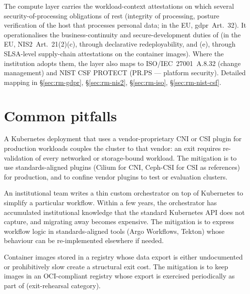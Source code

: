 \noindent The compute layer carries the workload-context
attestations on which several security-of-processing obligations
of  rest (integrity of processing,
posture verification of the host that processes personal data; in
the EU, \gls{gdpr}~Art.~32). It operationalises the
business-continuity and secure-development duties of
 (in the EU, NIS2~Art.~21(2)(c),
through declarative redeployability, and (e), through SLSA-level
supply-chain attestations on the container images). Where the
institution adopts them, the layer also maps to ISO/IEC~27001~A.8.32
(change management) and NIST CSF \textsf{PROTECT} (PR.PS ---
platform security). Detailed mapping in
 \S\ref{sec:rm-gdpr},
\S\ref{sec:rm-nis2}, \S\ref{sec:rm-iso}, \S\ref{sec:rm-nist-csf}.

\section{Common pitfalls}
\label{sec:co-pitfalls}

\begin{pitfallbox}
\noindent A Kubernetes deployment that uses a vendor-proprietary CNI
or CSI plugin for production workloads couples the cluster to that
vendor: an exit requires re-validation of every networked or
storage-bound workload. The mitigation is to use standards-aligned
plugins (Cilium for CNI, Ceph-CSI for CSI as references) for
production, and to confine vendor plugins to test or evaluation
clusters.
\end{pitfallbox}

\begin{pitfallbox}
\noindent An institutional team writes a thin custom orchestrator on
top of Kubernetes to simplify a particular workflow. Within a few
years, the orchestrator has accumulated institutional knowledge that
the standard Kubernetes API does not capture, and migrating away
becomes expensive. The mitigation is to express workflow logic in
standards-aligned tools (Argo Workflows, Tekton) whose behaviour can
be re-implemented elsewhere if needed.
\end{pitfallbox}

\begin{pitfallbox}
\noindent Container images stored in a registry whose data export is
either undocumented or prohibitively slow create a structural exit
cost. The mitigation is to keep images in an OCI-compliant registry
whose export is exercised periodically as part of
 (exit-rehearsal category).
\end{pitfallbox}

